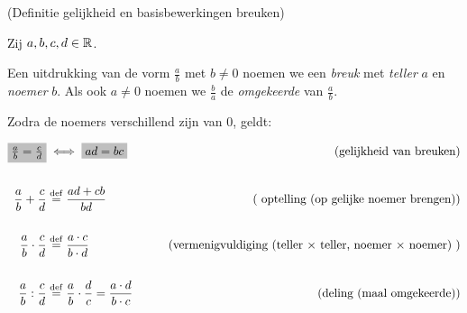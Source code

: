 \documentclass{ximera}
\begin{document}
\begin{definition} (Definitie gelijkheid en basisbewerkingen breuken)
	
Zij $a,b,c,d\in \mathbb{R}$. 

Een uitdrukking van de vorm $\frac ab$ met $b\neq0$ noemen we een \textit{breuk} met \textit{teller} $a$ en \textit{noemer} $b$. Als ook $a\neq0$ noemen we $\frac ba$ de \textit{omgekeerde} van $\frac ab$. 

Zodra de noemers verschillend zijn van $0$, geldt:

\begin{align*}
		\important{\frac{a}{b} = \frac{c}{d}}  &\iff \important{ad = bc} 
			& \tag{\label{def: gelijkheid breuken}gelijkheid van breuken}\\ \\
		\frac{a}{b}+\frac{c}{d} &\perdef \frac{ad+cb}{bd} 
			& \tag{\label{def:optelling breuken} optelling (op gelijke noemer brengen)} \\ \\
		\frac{a}{b} \cdot \frac{c}{d} &\perdef \frac{a\cdot c}{b\cdot d} 
			& \tag{\label{def: vermenigvuldiging breuken}vermenigvuldiging (teller $\times$ teller, noemer $\times$ noemer) } \\ \\
		\frac{a}{b} : \frac{c}{d} &\perdef \frac ab \cdot \frac dc = \frac{a\cdot d}{b\cdot c} 
		& \tag{\label {def: deling breuken}deling (maal omgekeerde)}  \\
\end{align*}

\end{definition}
\end{document}
